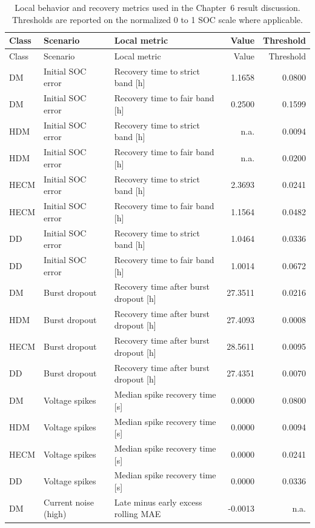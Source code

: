 \documentclass[
    a4paper,
    12pt,
    titlepage,
    bibliography=totoc,
    twoside=on,
    parskip=false,
    numbers=noenddot,
    cleardoublepage=empty,
    DIV=12,
    BCOR=12.0mm,
    headheight=36pt,
    headings=openright
]{scrreprt}
\begin{document}
\begin{longtable}{p{1.2cm}p{2.6cm}p{4.4cm}rr}
\caption[Local robustness and recovery metrics.]{Local behavior and recovery metrics used in the Chapter~6 result discussion. Thresholds are reported on the normalized 0 to 1 SOC scale where applicable.}\label{tab:robustness_appendix_local_metrics}\\
\toprule
Class & Scenario & Local metric & Value & Threshold \\
\midrule
\endfirsthead
\toprule
Class & Scenario & Local metric & Value & Threshold \\
\midrule
\endhead
DM & Initial SOC error & Recovery time to strict band [h] & 1.1658 & 0.0800 \\
DM & Initial SOC error & Recovery time to fair band [h] & 0.2500 & 0.1599 \\
HDM & Initial SOC error & Recovery time to strict band [h] & n.a. & 0.0094 \\
HDM & Initial SOC error & Recovery time to fair band [h] & n.a. & 0.0200 \\
HECM & Initial SOC error & Recovery time to strict band [h] & 2.3693 & 0.0241 \\
HECM & Initial SOC error & Recovery time to fair band [h] & 1.1564 & 0.0482 \\
DD & Initial SOC error & Recovery time to strict band [h] & 1.0464 & 0.0336 \\
DD & Initial SOC error & Recovery time to fair band [h] & 1.0014 & 0.0672 \\
DM & Burst dropout & Recovery time after burst dropout [h] & 27.3511 & 0.0216 \\
HDM & Burst dropout & Recovery time after burst dropout [h] & 27.4093 & 0.0008 \\
HECM & Burst dropout & Recovery time after burst dropout [h] & 28.5611 & 0.0095 \\
DD & Burst dropout & Recovery time after burst dropout [h] & 27.4351 & 0.0070 \\
DM & Voltage spikes & Median spike recovery time [s] & 0.0000 & 0.0800 \\
HDM & Voltage spikes & Median spike recovery time [s] & 0.0000 & 0.0094 \\
HECM & Voltage spikes & Median spike recovery time [s] & 0.0000 & 0.0241 \\
DD & Voltage spikes & Median spike recovery time [s] & 0.0000 & 0.0336 \\
DM & Current noise (high) & Late minus early excess rolling MAE & -0.0013 & n.a. \\

\end{longtable}
\end{document}
